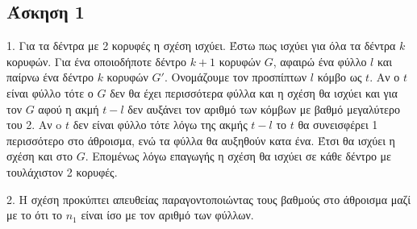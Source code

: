 \newpage\subsection*{Άσκηση 1}
1. Για τα δέντρα με 2 κορυφές η σχέση ισχύει. Έστω πως ισχύει για όλα τα δέντρα $k$ κορυφών.
Για ένα οποιοδήποτε δέντρο $k+1$ κορυφών $G$, αφαιρώ ένα φύλλο $l$ και παίρνω ένα δέντρο $k$ κορυφών $G'$. 
Ονομάζουμε τον προσπίπτων $l$ κόμβο ως $t$. Αν ο $t$
είναι φύλλο τότε ο $G$ δεν θα έχει περισσότερα φύλλα και η σχέση θα ισχύει και για τον $G$ αφού η ακμή
$t-l$ δεν αυξάνει τον αριθμό των κόμβων με βαθμό μεγαλύτερο του 2.
Aν o $t$ δεν είναι φύλλο τότε λόγω της ακμής $t-l$ το $t$ θα συνεισφέρει 1 περισσότερο στο άθροισμα, ενώ 
τα φύλλα θα αυξηθούν κατα ένα. Έτσι θα ισχύει η σχέση και στο $G$. 
Επομένως λόγω επαγωγής η σχέση θα ισχύει σε κάθε δέντρο με τουλάχιστον 2 κορυφές.

2. Η σχέση προκύπτει απευθείας παραγοντοποιώντας τους βαθμούς στο άθροισμα μαζί με το ότι το $n_1$ είναι ίσο με τον αριθμό των φύλλων.
